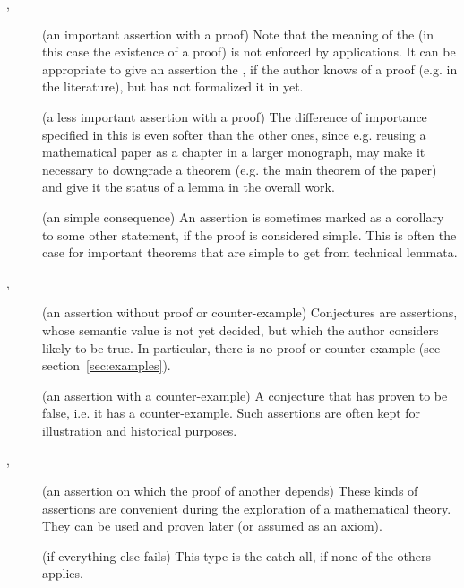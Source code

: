 \begin{description}
\item[{},
  {}] (an important assertion with a proof)
  Note that the meaning of the {} (in this case the
  existence of a proof) is not enforced by {\omdoc} applications. It can be
  appropriate to give an assertion the {}
  {}, if the author knows of a proof (e.g. in the
  literature), but has not formalized it in {\omdoc} yet.
\item[{}] (a less important assertion with a proof)
  The difference of importance specified in this {} is even softer than the other ones, since e.g. reusing a
  mathematical paper as a chapter in a larger monograph, may make it necessary to
  downgrade a theorem (e.g.  the main theorem of the paper) and give it the status
  of a lemma in the overall work.
\item[{}] (an simple consequence) An assertion
  is sometimes marked as a corollary to some other statement, if the proof is
  considered simple. This is often the case for important theorems that are simple
  to get from technical lemmata.
\item[{},
  {}] (an assertion without proof or
  counter-exam\-ple) Conjectures are assertions, whose semantic value is not yet
  decided, but which the author considers likely to be true. In particular, there
  is no proof or counter-example (see section~\ref{sec:examples}).
\item[{}] (an assertion with a
  counter-example) A conjecture that has proven to be false, i.e. it has a
  counter-example. Such assertions are often kept for illustration and historical
  purposes.
\item[{},
  {}] (an assertion on which the proof of
  another depends) These kinds of assertions are convenient during the
  exploration of a mathematical theory. They can be used and proven later (or
  assumed as an axiom).
\item[{}] (if everything else fails) This type
  is the catch-all, if none of the others applies.
\end{description}
  
